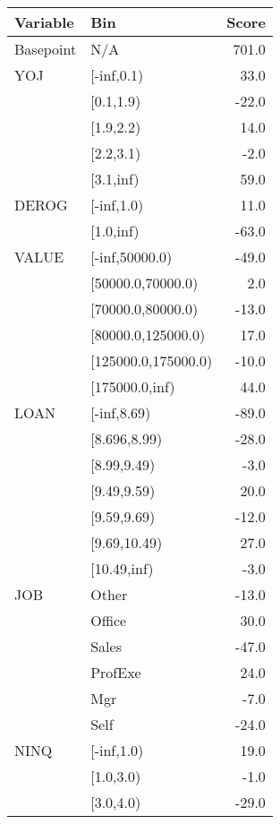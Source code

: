 \begin{appendices}
\begin{table}[H]
\begin{center}
\begin{tabular}{llr}
\toprule
   Variable &  Bin &  Score \\
\midrule
 Basepoint &  N/A &   701.0 \\
\midrule
     YOJ &                [-inf,0.1) &    33.0 \\
      &  [0.1,1.9) &   -22.0 \\
      &  [1.9,2.2) &    14.0 \\
      &                 [2.2,3.1) &    -2.0 \\
      &                 [3.1,inf) &    59.0 \\
\midrule
   DEROG &  [-inf,1.0) &    11.0 \\
    &   [1.0,inf) &   -63.0 \\
\midrule
   VALUE &       [-inf,50000.0) &   -49.0 \\
    &    [50000.0,70000.0) &     2.0 \\
    &    [70000.0,80000.0) &   -13.0 \\
    &   [80000.0,125000.0) &    17.0 \\
    &  [125000.0,175000.0) &   -10.0 \\
    &       [175000.0,inf) &    44.0 \\
\midrule
    LOAN &               [-inf,8.69) &   -89.0 \\
     &  [8.696,8.99) &   -28.0 \\
     &  [8.99,9.49) &    -3.0 \\
     &   [9.49,9.59) &    20.0 \\
     &   [9.59,9.69) &   -12.0 \\
     &  [9.69,10.49) &    27.0 \\
     &                [10.49,inf) &    -3.0 \\
\midrule
     JOB &    Other &   -13.0 \\
      &   Office &    30.0 \\
      &    Sales &   -47.0 \\
      &  ProfExe &    24.0 \\
      &      Mgr &    -7.0 \\
      &     Self &   -24.0 \\
\midrule
    NINQ &  [-inf,1.0) &    19.0 \\
     &   [1.0,3.0) &    -1.0 \\
     &   [3.0,4.0) &   -29.0 \\

\end{tabular}
\end{center}
\end{table}
\end{appendices}
